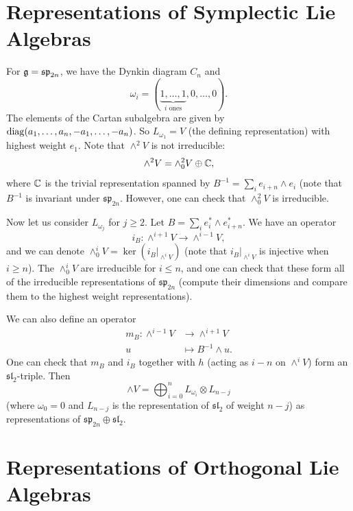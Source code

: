 \section{Representations of Symplectic Lie Algebras}

\begin{remark}
  For $\mathfrak{g} = \mathfrak{sp}_{2n}$,
  we have the Dynkin diagram $C_n$
  and
  \[
    \omega_i = (\underbrace{1, \dots, 1}_{i \text{ ones}}, 0, \dots, 0).
  \]
  The elements of the Cartan subalgebra
  are given by
  $\operatorname{diag}(a_1, \dots, a_n, -a_1, \dots, -a_n)$.
  So $L_{\omega_1} = V$ (the
  defining representation) with
  highest weight $e_1$. Note that
  $\wedge^2 V$ is not irreducible:
  \[
    \wedge^2 V
    = \wedge_0^2 V \oplus \mathbb{C},
  \]
  where $\mathbb{C}$ is the trivial
  representation spanned by
  $B^{-1} = \sum_i e_{i + n} \wedge e_i$ (note that $B^{-1}$ is
  invariant under $\mathfrak{sp}_{2n}$.
  However, one can check that
  $\wedge_0^2 V$ is irreducible.

  Now let us consider $L_{\omega_j}$
  for $j \ge 2$. Let $B = \sum_i e_i^* \wedge e_{i + n}^*$.
  We have an operator
  \[
    i_B : \wedge^{i + 1} V \longrightarrow \wedge^{i - 1} V,
  \]
  and we can denote
  $\wedge_0^i V = \ker(i_B|_{\wedge^i V})$
  (note that $i_B|_{\wedge^i V}$ is
  injective when $i \ge n$).
  The $\wedge^i_0 V$ are irreducible
  for $i \le n$, and one can check
  that these form all of the
  irreducible representations of
  $\mathfrak{sp}_{2n}$ (compute their
  dimensions and compare them to the
  highest weight representations).

  We can also define an operator
  \begin{align*}
    m_B : \wedge^{i - 1} V &\longrightarrow \wedge^{i + 1} V \\
    u &\mapsto B^{-1} \wedge u.
  \end{align*}
  One can check that $m_B$ and
  $i_B$ together with $h$ (acting as
  $i - n$ on $\wedge^i V$) form
  an $\mathfrak{sl}_2$-triple.
  Then
  \[
    \wedge V
    = \bigoplus_{i = 0}^n L_{\omega_i}
    \otimes L_{n - j}
  \]
  (where $\omega_0 = 0$ and
  $L_{n - j}$ is the
  representation of $\mathfrak{sl}_2$
  of weight $n - j$)
  as representations of
  $\mathfrak{sp}_{2n} \oplus \mathfrak{sl}_2$.
\end{remark}

\section{Representations of Orthogonal Lie Algebras}

